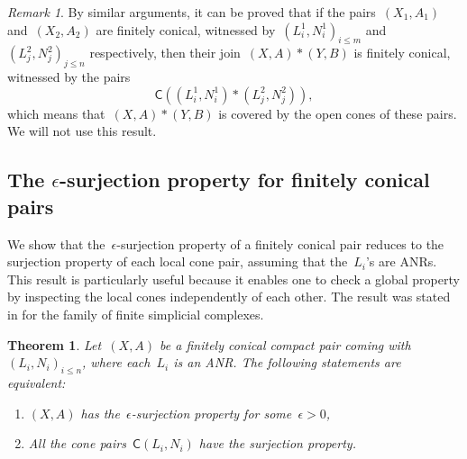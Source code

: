\documentclass[english,11pt]{article}
\theoremstyle{plain}
\newtheorem{theorem}{Theorem}[section]
\theoremstyle{remark}
\newtheorem{remark}{Remark}[section]
\theoremstyle{definition}
\newcommand{\unit}{\odot}%
\newcommand{\C}[1]{\mathsf{C}(#1)}%
\newcommand{\OC}[1]{\mathsf{OC}(#1)}%
\begin{document}
\begin{remark}
By similar arguments, it can be proved that if the pairs~$(X_1,A_1)$ and~$(X_2,A_2)$ are finitely conical, witnessed by~$(L^1_i,N^1_i)_{i\leq m}$ and~$(L^2_j,N^2_j)_{j\leq n}$ respectively, then their join~$(X,A)*(Y,B)$ is finitely conical, witnessed by the pairs
\begin{equation*}
\C{(L^1_i,N^1_i)*(L^2_j,N^2_j)},
\end{equation*}
which means that~$(X,A)*(Y,B)$ is covered by the open cones of these pairs. We will not use this result.
%
\end{remark}
\subsection{The \texorpdfstring{$\epsilon$}{epsilon}-surjection property for finitely conical pairs}

We show that the~$\epsilon$-surjection property of a finitely conical pair reduces to the surjection property of each local cone pair, assuming that the~$L_i$'s are ANRs. This result is particularly useful because it enables one to check a global property by inspecting the local cones independently of each other. The result was stated in \cite{AH22} for the family of finite simplicial complexes.

\begin{theorem}\label{thm_local_surjection}
Let~$(X,A)$ be a finitely conical compact pair coming with~$(L_{i},N_{i})_{i\leq n}$, where each~$L_i$ is an ANR. The following statements are equivalent:
\begin{enumerate}
\item $(X,A)$ has the~$\epsilon$-surjection property for some~$\epsilon>0$, 
\item All the cone pairs~$\C{L_{i},N_{i}}$ have the surjection property.
\end{enumerate}
\end{theorem}
\end{document}
